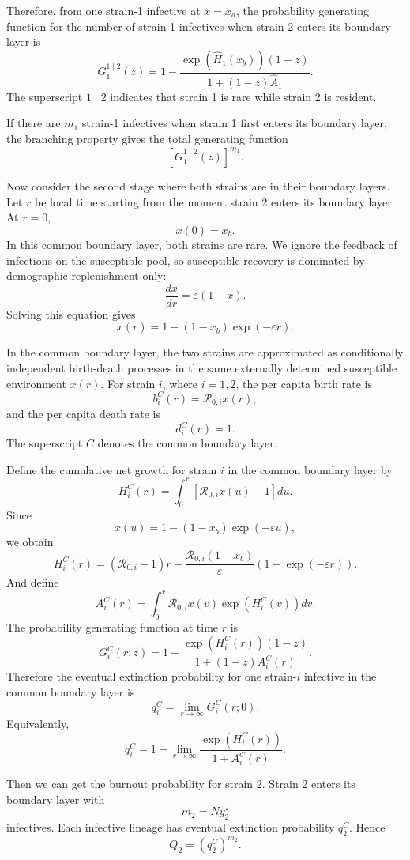 \documentclass[11pt]{article}
\begin{document}
Therefore, from one strain-1 infective at \(x=x_a\), the probability generating function for the number of strain-1 infectives when strain 2 enters its boundary layer is
\[
G_1^{1\mid 2}(z)
=
1-
\frac{\exp(\widehat H_1(x_b))(1-z)}
{1+(1-z)\widehat A_1}.
\]
The superscript \(1\mid 2\) indicates that strain 1 is rare while strain 2 is resident.

If there are \(m_1\) strain-1 infectives when strain 1 first enters its boundary layer, the branching property gives the total generating function
\[
\left[G_1^{1\mid 2}(z)\right]^{m_1}.
\]

Now consider the second stage where both strains are in their boundary layers. Let \(r\) be local time starting from the moment strain 2 enters its boundary layer. At \(r=0\),
\[
x(0)=x_b.
\]
In this common boundary layer, both strains are rare. We ignore the feedback of infections on the susceptible pool, so susceptible recovery is dominated by demographic replenishment only:
\[
\frac{dx}{dr}
=
\varepsilon(1-x).
\]
Solving this equation gives
\[
x(r)
=
1-(1-x_b)\exp(-\varepsilon r).
\]

In the common boundary layer, the two strains are approximated as conditionally independent birth-death processes in the same externally determined susceptible environment \(x(r)\). For strain \(i\), where \(i=1,2\), the per capita birth rate is
\[
b_i^C(r)=\mathcal R_{0,i}x(r),
\]
and the per capita death rate is
\[
d_i^C(r)=1.
\]
The superscript \(C\) denotes the common boundary layer.

Define the cumulative net growth for strain \(i\) in the common boundary layer by
\[
H_i^C(r)
=
\int_0^r[\mathcal R_{0,i}x(u)-1]du.
\]
Since
\[
x(u)=1-(1-x_b)\exp(-\varepsilon u),
\]
we obtain
\[
H_i^C(r)
=
(\mathcal R_{0,i}-1)r
-
\frac{\mathcal R_{0,i}(1-x_b)}{\varepsilon}
(1-\exp(-\varepsilon r)).
\]
And define 
\[
A_i^C(r)
=
\int_0^r
\mathcal R_{0,i}x(v)\exp(H_i^C(v))dv.
\]
The probability generating function at time \(r\) is
\[
G_i^C(r;z)
=
1-
\frac{\exp(H_i^C(r))(1-z)}
{1+(1-z)A_i^C(r)}.
\]
Therefore the eventual extinction probability for one strain-\(i\) infective in the common boundary layer is
\[
q_i^C
=
\lim_{r\to\infty}G_i^C(r;0).
\]
Equivalently,
\[
q_i^C
=
1-
\lim_{r\to\infty}
\frac{\exp(H_i^C(r))}
{1+A_i^C(r)}.
\]

Then we can get the burnout probability for strain 2. Strain 2 enters its boundary layer with
\[
m_2=Ny_2^\star
\]
infectives. Each infective lineage has eventual extinction probability \(q_2^C\). Hence
\[
Q_2
=
(q_2^C)^{m_2}.
\]
\end{document}
